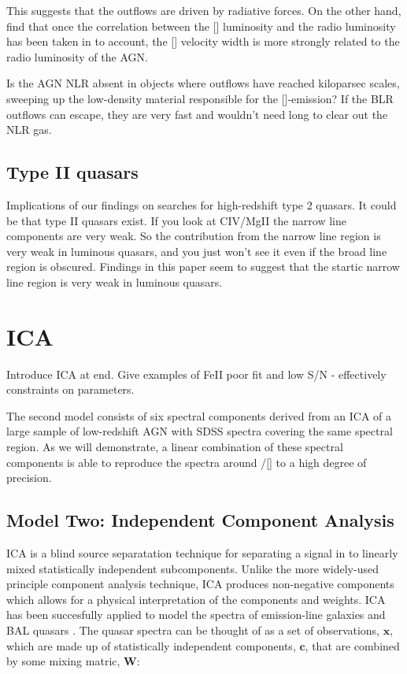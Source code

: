 This suggests that the outflows are driven by radiative forces. 
On the other hand, \citet{mullaney13} find that once the correlation between the [] luminosity and the radio luminosity has been taken in to account, the [] velocity width is more strongly related to the radio luminosity of the \ac{AGN}. 

Is the \ac{AGN} \ac{NLR} absent in objects where outflows have reached kiloparsec scales, sweeping up the low-density material responsible for the []-emission?
If the \ac{BLR} outflows can escape, they are very fast and wouldn't need long to clear out the \ac{NLR} gas. 


\subsection{Type II quasars}

Implications of our findings on searches for high-redshift type 2 quasars. It could be that type II quasars exist. If you look at CIV/MgII the narrow line components are very weak. So the contribution from the narrow line region is very weak in luminous quasars, and you just won't see it even if the broad line region is obscured.
Findings in this paper seem to suggest that the startic narrow line region is very weak in luminous quasars. 


\section{ICA}

Introduce ICA at end. 
Give examples of FeII poor fit and low S/N - effectively constraints on parameters. 

The second model consists of six spectral components derived from an \ac{ICA} of a large sample of low-redshift \ac{AGN} with SDSS spectra covering the same spectral region.
As we will demonstrate, a linear combination of these spectral components is able to reproduce the spectra around \hbns/[] to a high degree of precision.  

\subsection{Model Two: Independent Component Analysis}

\ac{ICA} is a blind source separatation technique for separating a signal in to linearly mixed statistically independent subcomponents. 
Unlike the more widely-used principle component analysis technique, \ac{ICA} produces non-negative components which allows for a physical interpretation of the components and weights.  
\ac{ICA} has been succesfully applied to model the spectra of emission-line galaxies \citep{allen13} and BAL quasars \citep{allen11}. 
The quasar spectra can be thought of as a set of observations, $\bm{x}$, which are made up of statistically independent components, $\bm{c}$, that are combined by some mixing matric, $\bm{W}$:

